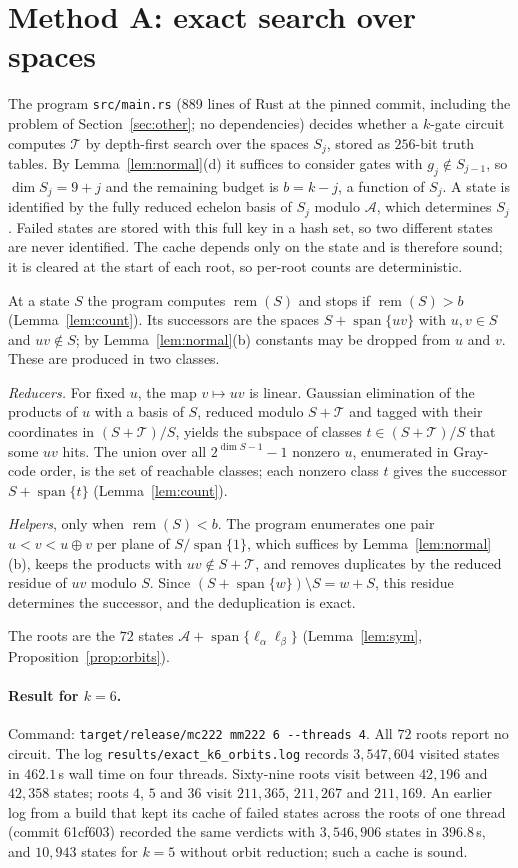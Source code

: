 \documentclass[11pt,a4paper]{article}
\theoremstyle{definition}
\newcommand{\Aff}{\mathcal{A}}
\newcommand{\Tg}{\mathcal{T}}
\newcommand{\rem}{\operatorname{rem}}
\newcommand{\spn}{\operatorname{span}}
\newcommand{\code}[1]{\texttt{#1}}
\begin{document}
\section{Method A: exact search over spaces}\label{sec:exact}

The program \code{src/main.rs} (889 lines of Rust at the pinned commit, including the problem of Section~\ref{sec:other}; no dependencies) decides whether a $k$-gate circuit computes $\Tg$ by depth-first search over the spaces $S_j$, stored as $256$-bit truth tables. By Lemma~\ref{lem:normal}(d) it suffices to consider gates with $g_j\notin S_{j-1}$, so $\dim S_j=9+j$ and the remaining budget is $b=k-j$, a function of $S_j$. A state is identified by the fully reduced echelon basis of $S_j$ modulo $\Aff$, which determines $S_j$. Failed states are stored with this full key in a hash set, so two different states are never identified. The cache depends only on the state and is therefore sound; it is cleared at the start of each root, so per-root counts are deterministic.

At a state $S$ the program computes $\rem(S)$ and stops if $\rem(S)>b$ (Lemma~\ref{lem:count}). Its successors are the spaces $S+\spn\{uv\}$ with $u,v\in S$ and $uv\notin S$; by Lemma~\ref{lem:normal}(b) constants may be dropped from $u$ and $v$. These are produced in two classes.

\emph{Reducers.} For fixed $u$, the map $v\mapsto uv$ is linear. Gaussian elimination of the products of $u$ with a basis of $S$, reduced modulo $S+\Tg$ and tagged with their coordinates in $(S+\Tg)/S$, yields the subspace of classes $t\in(S+\Tg)/S$ that some $uv$ hits. The union over all $2^{\dim S-1}-1$ nonzero $u$, enumerated in Gray-code order, is the set of reachable classes; each nonzero class $t$ gives the successor $S+\spn\{t\}$ (Lemma~\ref{lem:count}).

\emph{Helpers}, only when $\rem(S)<b$. The program enumerates one pair $u<v<u\oplus v$ per plane of $S/\spn\{1\}$, which suffices by Lemma~\ref{lem:normal}(b), keeps the products with $uv\notin S+\Tg$, and removes duplicates by the reduced residue of $uv$ modulo $S$. Since $(S+\spn\{w\})\setminus S=w+S$, this residue determines the successor, and the deduplication is exact.

The roots are the $72$ states $\Aff+\spn\{\ell_\alpha\ell_\beta\}$ (Lemma~\ref{lem:sym}, Proposition~\ref{prop:orbits}).

\paragraph{Result for $k=6$.} Command: \code{target/release/mc222 mm222 6 -{}-threads 4}. All $72$ roots report no circuit. The log \code{results/exact\_k6\_orbits.log} records $3{,}547{,}604$ visited states in $462.1$\,s wall time on four threads. Sixty-nine roots visit between $42{,}196$ and $42{,}358$ states; roots $4$, $5$ and $36$ visit $211{,}365$, $211{,}267$ and $211{,}169$. An earlier log from a build that kept its cache of failed states across the roots of one thread (commit 61cf603) recorded the same verdicts with $3{,}546{,}906$ states in $396.8$\,s, and $10{,}943$ states for $k=5$ without orbit reduction; such a cache is sound.
\end{document}
